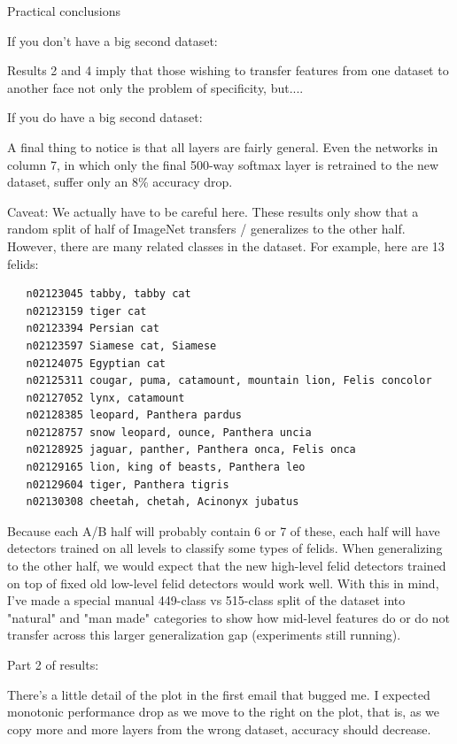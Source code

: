 Practical conclusions

If you don't have a big second dataset:

Results 2 and 4 imply that those wishing to transfer features from one dataset to another face not only the problem of specificity, but....



If you do have a big second dataset:







A final thing to notice is that all layers are fairly general. Even the networks in column 7, in which only the final 500-way softmax layer is retrained to the new dataset, suffer only an 8\% accuracy drop.

Caveat: We actually have to be careful here. These results only show that a random split of half of ImageNet transfers / generalizes to the other half. However, there are many related classes in the dataset. For example, here are 13 felids:

\begin{verbatim}
   n02123045 tabby, tabby cat
   n02123159 tiger cat
   n02123394 Persian cat
   n02123597 Siamese cat, Siamese
   n02124075 Egyptian cat
   n02125311 cougar, puma, catamount, mountain lion, Felis concolor
   n02127052 lynx, catamount
   n02128385 leopard, Panthera pardus
   n02128757 snow leopard, ounce, Panthera uncia
   n02128925 jaguar, panther, Panthera onca, Felis onca
   n02129165 lion, king of beasts, Panthera leo
   n02129604 tiger, Panthera tigris
   n02130308 cheetah, chetah, Acinonyx jubatus
\end{verbatim}

Because each A/B half will probably contain 6 or 7 of these, each half will have detectors trained on all levels to classify some types of felids. When generalizing to the other half, we would expect that the new high-level felid detectors trained on top of fixed old low-level felid detectors would work well. With this in mind, I've made a special manual 449-class vs 515-class split of the dataset into "natural" and "man made" categories to show how mid-level features do or do not transfer across this larger generalization gap (experiments still running).






Part 2 of results:

There's a little detail of the plot in the first email that bugged me. I expected monotonic performance drop as we move to the right on the plot, that is, as we copy more and more layers from the wrong dataset, accuracy should decrease.

